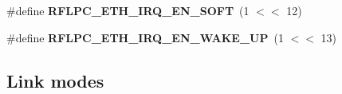 \begin{DoxyCompactItemize}
\item 
\hypertarget{group__eth_ga740d08fdbdc77f23dead00d1152d70b0}{\#define {\bfseries R\-F\-L\-P\-C\-\_\-\-E\-T\-H\-\_\-\-I\-R\-Q\-\_\-\-E\-N\-\_\-\-S\-O\-F\-T}~(1 $<$$<$ 12)}\label{group__eth_ga740d08fdbdc77f23dead00d1152d70b0}

\item 
\hypertarget{group__eth_gaec19e9506463e7e41e75cfd5176fee8d}{\#define {\bfseries R\-F\-L\-P\-C\-\_\-\-E\-T\-H\-\_\-\-I\-R\-Q\-\_\-\-E\-N\-\_\-\-W\-A\-K\-E\-\_\-\-U\-P}~(1 $<$$<$ 13)}\label{group__eth_gaec19e9506463e7e41e75cfd5176fee8d}

\end{DoxyCompactItemize}
\subsection*{Link modes}
\label{_amgrpc184a67844262e1dcf20eb4d7fdec5c2}%
